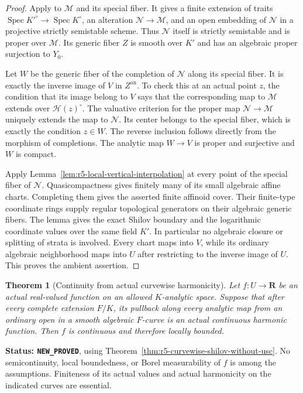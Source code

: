 \documentclass[11pt,a4paper]{article}
\numberwithin{equation}{section}
\newtheorem{theorem}{Theorem}[section]
\theoremstyle{definition}
\theoremstyle{remark}
\begin{document}
\begin{proof}
Apply \cite[Theorem 6.5]{dJ96} to $\mathcal M$ and its special
fiber. It gives a finite extension of traits
$\operatorname{Spec}K'^\circ\to\operatorname{Spec}K^\circ$,
an alteration $\mathcal N\to\mathcal M$, and an open embedding
of $\mathcal N$ in a projective strictly semistable scheme.
Thus $\mathcal N$ itself is strictly semistable and is proper
over $\mathcal M$. Its generic fiber $Z$ is smooth over $K'$
and has an algebraic proper surjection to $Y_0$.

Let $W$ be the generic fiber of the completion of $\mathcal N$
along its special fiber. It is exactly the inverse image of
$V$ in $Z^{\mathrm{an}}$. To check this at an actual point
$z$, the condition that its image belong to $V$ says that
the corresponding map to $\mathcal M$ extends over
$\mathscr H(z)^\circ$. The valuative criterion for the proper
map $\mathcal N\to\mathcal M$ uniquely extends the map to
$\mathcal N$. Its center belongs to the special fiber, which
is exactly the condition $z\in W$. The reverse inclusion
follows directly from the morphism of completions. The
analytic map $W\to V$ is proper and surjective and $W$
is compact.

Apply Lemma~\ref{lem:r5-local-vertical-interpolation} at every
point of the special fiber of $\mathcal N$. Quasicompactness
gives finitely many of its small algebraic affine charts.
Completing them gives the asserted finite affinoid cover.
Their finite-type coordinate rings supply regular topological
generators on their algebraic generic fibers. The lemma gives
the exact Shilov boundary and the logarithmic coordinate
values over the same field $K'$. In particular no algebraic
closure or splitting of strata is involved. Every chart maps
into $V$, while its ordinary algebraic neighborhood maps into
$U$ after restricting to the inverse image of $U$. This proves
the ambient assertion.
\end{proof}

\begin{theorem}[Continuity from actual curvewise harmonicity]
\label{thm:r5-continuity-from-curves}
Let $f:U\to\mathbf R$ be an actual real-valued function on an
allowed $K$-analytic space. Suppose that after every complete
extension $F/K$, its pullback along every analytic map from
an ordinary open in a smooth algebraic $F$-curve is an actual
continuous harmonic function. Then $f$ is continuous and therefore
locally bounded.
\end{theorem}

\noindent\textbf{Status: \texttt{NEW\_PROVED}}, using
Theorem~\ref{thm:r5-curvewise-shilov-without-usc}.
No semicontinuity, local boundedness, or Borel measurability of
$f$ is among the assumptions. Finiteness of its actual values
and actual harmonicity on the indicated curves are essential.
\end{document}
